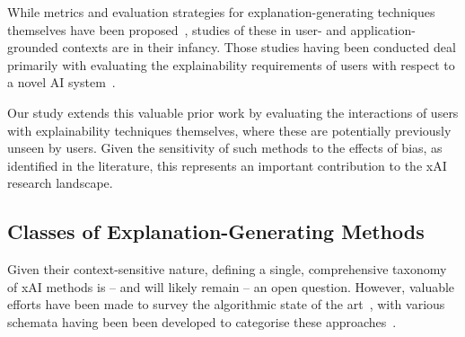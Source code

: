 While metrics and evaluation strategies for explanation-generating techniques themselves have been proposed~\cite{doshi2017towards, HolzingerEtAl:2019:Wiley-Paper, HolzingerEtAl:2020:QualityOfExplanations}, studies of these in user- and application-grounded contexts are in their infancy. Those studies having been conducted deal primarily with evaluating the explainability requirements of users with respect to a novel AI system~\cite{liao2020questioning, cai2019hello}. 


Our study extends this valuable prior work by evaluating the interactions of users with explainability techniques themselves, where these are potentially previously unseen by users. Given the sensitivity of such methods to the effects of bias, as identified in the literature, this represents an important contribution to the xAI research landscape.



\subsection{Classes of Explanation-Generating Methods}
\label{sec:related:classes}

Given their context-sensitive nature, defining a single, comprehensive taxonomy of xAI methods is -- and will likely remain -- an open question. However, valuable efforts have been made to survey the algorithmic state of the art~\cite{tjoa_survey_2020, deshpande2021}, with various schemata having been been developed to categorise these approaches~\cite{arrieta2020explainable}.

